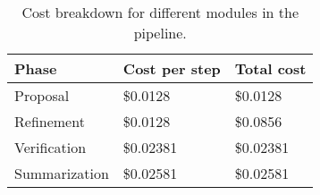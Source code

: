 \begin{table}[H]
\centering
\small
\begin{tabular}{lll} \toprule
\bfseries Phase        & \bfseries Cost per step & \bfseries Total cost \\ \midrule
Proposal     & \$\num{0.0128}      & \$\num{0.0128}   \\
Refinement   & \$\num{0.0128}      & \$\num{0.0856}   \\
Verification & \$\num{0.02381}     & \$\num{0.02381}  \\
Summarization   & \$\num{0.02581}     & \$\num{0.02581} \\ \bottomrule
\end{tabular}
\caption{Cost breakdown for different modules in the pipeline.}
\label{tab:cost_breakdown}
\end{table}
